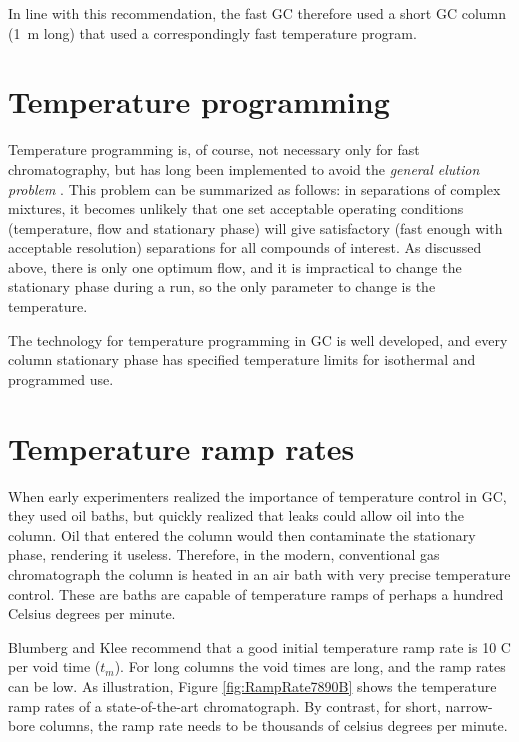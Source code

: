 In line with this recommendation, the fast GC therefore used a short GC column
(\SI{1}{\metre} long) that used a correspondingly fast temperature program.

\section{Temperature programming}

Temperature programming is, of course, not necessary only for fast
chromatography, but has long been implemented to avoid the \textit{general
elution problem} \autocite{Skoog2007}. This problem can be summarized as
follows: in separations of complex mixtures, it becomes unlikely that one set
acceptable operating conditions (temperature, flow and stationary phase) will
give satisfactory (fast enough with acceptable resolution) separations for all
compounds of interest. As discussed above, there is only one optimum flow, and
it is impractical to change the stationary phase during a run, so the only
parameter to change is the temperature.

The technology for temperature programming in GC is well developed, and every
column stationary phase has specified temperature limits for isothermal and
programmed use.

\section{Temperature ramp rates}

When early experimenters realized the importance of temperature control in GC,
they used oil baths, but quickly realized that leaks could allow oil into the
column. Oil that entered the column would then contaminate the stationary phase,
rendering it useless. Therefore, in the modern, conventional gas chromatograph
the column is heated in an air bath with very precise temperature control. These
are baths are capable of temperature ramps of perhaps a hundred Celsius degrees
per minute. 

Blumberg and Klee \autocite{Blumberg2000} recommend that a good initial
temperature ramp rate is 10 C\textdegree{} per void time ($t_m$). For long
columns the void times are long, and the ramp rates can be low. As illustration,
Figure \ref{fig:RampRate7890B} shows the temperature ramp rates of a
state-of-the-art chromatograph. By contrast, for short, narrow-bore columns, the
ramp rate needs to be thousands of celsius degrees per minute.

